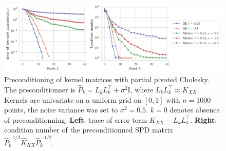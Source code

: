 \documentclass{article}
\makeatletter
\def\Id{\@ifnextchar[\Id@command{\mathbb I}}
\def\Id@command[#1]{\mathbb I_{#1}}
\makeatother
\begin{document}

\begin{figure}[ht!]
    \centering
    \includegraphics[width=0.9\linewidth]{report/res/kernel_preconditionning_1d_uniform.pdf}
    \caption{Preconditioning of kernel matrices with partial pivoted Cholesky. The preconditionner is $\widehat P_k = L_k L_k^\top + \sigma^2 \mathbb I$, 
    where $L_kL_k^\top \approx K_{XX}$. Kernels are univariate on a uniform grid on $[0, 1]$ with $n = 1000$ points, the noise variance was set to $\sigma^2 = 0.5$. $k = 0$ denotes absence of preconditionning.
    \textbf{Left}: trace of error term $K_{XX} - L_k L_k^\top$. \textbf{Right}: condition number of the preconditionned SPD matrix $\widehat P_k^{-1/2} \widehat K_{XX} \widehat P_k^{-1/2}$.}
    \label{fig:kernel_precond_1d_unif}
\end{figure}
\end{document}

